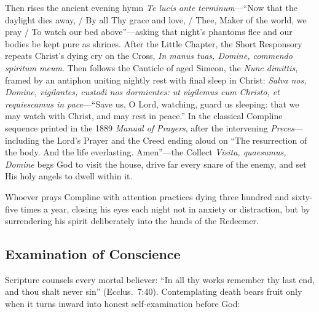 Then rises the ancient evening hymn \emph{Te lucis ante terminum}---``Now that the daylight dies away, / By all Thy grace and love, / Thee, Maker of the world, we pray / To watch our bed above''---asking that night's phantoms flee and our bodies be kept pure as shrines. After the Little Chapter, the Short Responsory repeats Christ's dying cry on the Cross, \emph{In manus tuas, Domine, commendo spiritum meum}. Then follows the Canticle of aged Simeon, the \emph{Nunc dimittis}, framed by an antiphon uniting nightly rest with final sleep in Christ: \emph{Salva nos, Domine, vigilantes, custodi nos dormientes: ut vigilemus cum Christo, et requiescamus in pace}---``Save us, O Lord, watching, guard us sleeping: that we may watch with Christ, and may rest in peace.'' In the classical Compline sequence printed in the 1889 \emph{Manual of Prayers}, after the intervening \emph{Preces}---including the Lord's Prayer and the Creed ending aloud on ``The resurrection of the body. And the life everlasting. Amen''---the Collect \emph{Visita, quaesumus, Domine} begs God to visit the house, drive far every snare of the enemy, and set His holy angels to dwell within it.

Whoever prays Compline with attention practices dying three hundred and sixty-five times a year, closing his eyes each night not in anxiety or distraction, but by surrendering his spirit deliberately into the hands of the Redeemer.

\subsection*{Examination of Conscience}

Scripture counsels every mortal believer: ``In all thy works remember thy last end, and thou shalt never sin'' (Ecclus.\ 7:40). Contemplating death bears fruit only when it turns inward into honest self-examination before God:


